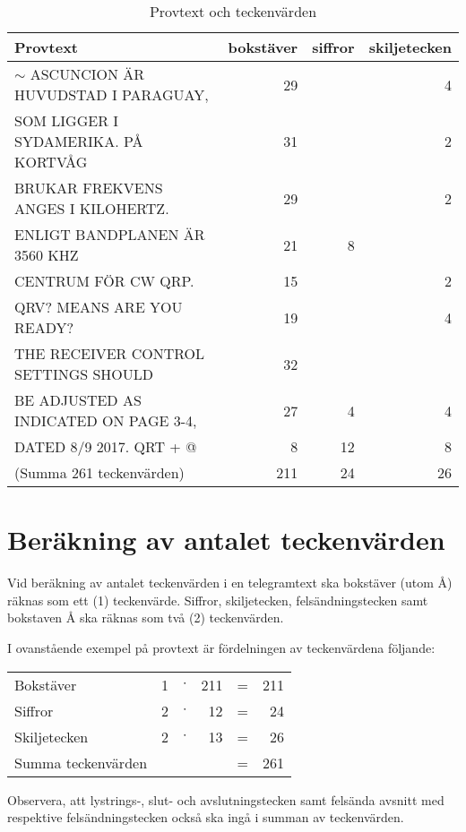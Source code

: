 \begin{table*}[t]
  \begin{center}
    \begin{tabular}{l|r|r|r|}
	Provtext & bokstäver & siffror & skiljetecken\\ \hline
	$\sim$ ASCUNCION ÄR HUVUDSTAD I PARAGUAY, & 29 & & 4\\
	SOM LIGGER I SYDAMERIKA. PÅ KORTVÅG & 31 & & 2\\
	BRUKAR FREKVENS ANGES I KILOHERTZ. & 29 & & 2\\
	ENLIGT BANDPLANEN ÄR 3560 KHZ & 21 & 8 &\\
	CENTRUM FÖR CW QRP. & 15& & 2\\
	QRV? MEANS ARE YOU READY? & 19 & & 4 \\
	THE RECEIVER CONTROL SETTINGS SHOULD & 32 & &\\
	BE ADJUSTED AS INDICATED ON PAGE 3-4, & 27 & 4 & 4\\
	DATED 8/9 2017. QRT + @ & 8 & 12 & 8\\ \hline
	(Summa 261 teckenvärden)& 211 & 24 & 26\\
    \end{tabular}
    \caption{Provtext och teckenvärden}
    \label{tab:provtext}
  \end{center}
\end{table*}

\section[Teckenvärden]{Beräkning av antalet teckenvärden}

Vid beräkning av antalet teckenvärden i en telegramtext ska bokstäver (utom Å)
räknas som ett (1) teckenvärde.
Siffror, skiljetecken, felsändningstecken samt bokstaven Å ska räknas som två
(2) teckenvärden.

I ovanstående exempel på provtext  är fördelningen av
teckenvärdena följande:

\begin{tabular}{lrcrcr}
	Bokstäver          & 1 & $\cdot$ & 211 & = & 211 \\
	Siffror            & 2 & $\cdot$ & 12  & = & 24  \\
	Skiljetecken       & 2 & $\cdot$ & 13  & = & 26  \\
	Summa teckenvärden &   &         &     & = & 261
\end{tabular}

Observera, att lystrings-, slut- och avslutningstecken samt felsända avsnitt med
respektive felsändningstecken också ska ingå i summan av teckenvärden.

